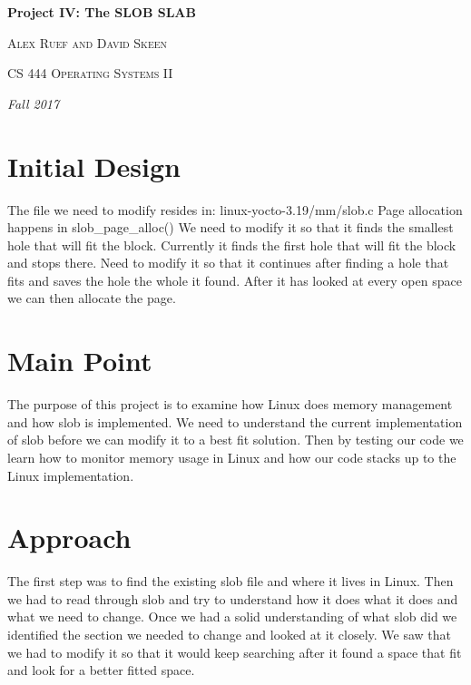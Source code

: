 \documentclass[10pt,drafclsnofoot,onecolumn]{article}
\begin{document}
               
\begin{titlepage}
\centering
{\huge\bfseries Project IV: The SLOB SLAB\par}
\vspace{.5cm}
{\scshape Alex Ruef and David Skeen \par}
\vspace{.5cm}   
{\scshape CS 444 Operating Systems II\par}
\vspace{.5cm} 
{\Large\itshape Fall 2017\par}
\par
\par
\begin{abstract}
In project 4 we are tasked with implementing a best-fit allocation algorithm.
The base Linux Yocto OS uses a first-fit allocation algorithm.
Based on the current implementation we make modifications to change it from first-fit to best-fit allocation.
While working on this project we learn about SLOB allocators and memory management in Linux.

\end{abstract}
\end{titlepage}

\section{Initial Design}
The file we need to modify resides in: linux-yocto-3.19/mm/slob.c
Page allocation happens in slob\_page\_alloc()
We need to modify it so that it finds the smallest hole that will fit the block.
Currently it finds the first hole that will fit the block and stops there.
Need to modify it so that it continues after finding a hole that fits and saves the hole the whole it found.
After it has looked at every open space we can then allocate the page.

\section{Main Point}
The purpose of this project is to examine how Linux does memory management and how slob is implemented.
We need to understand the current implementation of slob before we can modify it to a best fit solution.
Then by testing our code we learn how to monitor memory usage in Linux and how our code stacks up to the Linux implementation.

\section{Approach}
The first step was to find the existing slob file and where it lives in Linux.
Then we had to read through slob and try to understand how it does what it does and what we need to change.
Once we had a solid understanding of what slob did we identified the section we needed to change and looked at it closely.
We saw that we had to modify it so that it would keep searching after it found a space that fit and look for a better fitted space.
\end{document}
